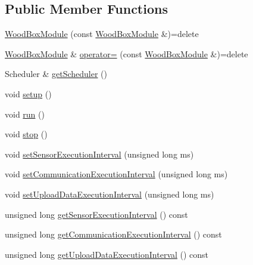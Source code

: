 \subsection*{Public Member Functions}
\begin{DoxyCompactItemize}
\item 
\mbox{\hyperlink{classwood_box_1_1module_1_1_wood_box_module_ade3d82ff1e508da2ad37185c208f9333}{Wood\+Box\+Module}} (const \mbox{\hyperlink{classwood_box_1_1module_1_1_wood_box_module}{Wood\+Box\+Module}} \&)=delete
\item 
\mbox{\hyperlink{classwood_box_1_1module_1_1_wood_box_module}{Wood\+Box\+Module}} \& \mbox{\hyperlink{classwood_box_1_1module_1_1_wood_box_module_acdae18f8e9e685cdbce5a4fc99956ab3}{operator=}} (const \mbox{\hyperlink{classwood_box_1_1module_1_1_wood_box_module}{Wood\+Box\+Module}} \&)=delete
\item 
Scheduler \& \mbox{\hyperlink{classwood_box_1_1module_1_1_wood_box_module_a24b14dd95e7b1c5a7ba31107cd0c524d}{get\+Scheduler}} ()
\item 
void \mbox{\hyperlink{classwood_box_1_1module_1_1_wood_box_module_a610b2339bd0ff26d2cde59d2006a4aed}{setup}} ()
\item 
void \mbox{\hyperlink{classwood_box_1_1module_1_1_wood_box_module_ac65e58ab2338b1e3f57e4ce5d9e70c6c}{run}} ()
\item 
void \mbox{\hyperlink{classwood_box_1_1module_1_1_wood_box_module_abbc32e89fe1ace40f447539237c0b713}{stop}} ()
\item 
void \mbox{\hyperlink{classwood_box_1_1module_1_1_wood_box_module_aa5e44c8631ee30e85c16ffc0454c8210}{set\+Sensor\+Execution\+Interval}} (unsigned long ms)
\item 
void \mbox{\hyperlink{classwood_box_1_1module_1_1_wood_box_module_a0242f49765460d7c1e0528260ba1c26e}{set\+Communication\+Execution\+Interval}} (unsigned long ms)
\item 
void \mbox{\hyperlink{classwood_box_1_1module_1_1_wood_box_module_ada9e2ee4b4da9396c504c0d0217d0c2f}{set\+Upload\+Data\+Execution\+Interval}} (unsigned long ms)
\item 
unsigned long \mbox{\hyperlink{classwood_box_1_1module_1_1_wood_box_module_a4d5b8fd2ec5aeacb5704435bb6d961e7}{get\+Sensor\+Execution\+Interval}} () const
\item 
unsigned long \mbox{\hyperlink{classwood_box_1_1module_1_1_wood_box_module_ad4a7b447a617d9c6908ef624cfd2cab4}{get\+Communication\+Execution\+Interval}} () const
\item 
unsigned long \mbox{\hyperlink{classwood_box_1_1module_1_1_wood_box_module_a9582f3340d1aa35abfe278dec41f4313}{get\+Upload\+Data\+Execution\+Interval}} () const

\end{DoxyCompactItemize}
